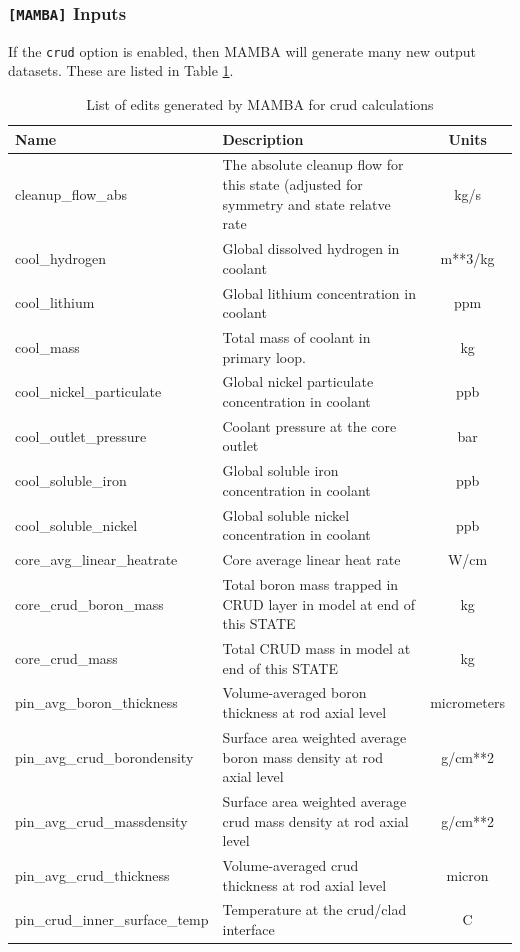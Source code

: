 \FloatBarrier

\subsubsection{\texttt{[MAMBA]} Inputs}

If the \texttt{crud} option is enabled, then MAMBA will generate many new output datasets.  These are listed in Table \ref{tab:mamba-edits}.

\begin{table}[h]
    \centering
    \caption{List of edits generated by MAMBA for \acrshort{crud} calculations}
    \label{tab:mamba-edits}
\begin{tabular}{|l|p{}|c|}\hline
    \textbf{Name} & \textbf{Description} & \textbf{Units} \\\hline
cleanup\_flow\_abs & The absolute cleanup flow for this state (adjusted for symmetry and state relatve rate & kg/s \\ \hline
cool\_hydrogen & Global dissolved hydrogen in coolant & m**3/kg \\\hline
cool\_lithium & Global lithium concentration in coolant & ppm \\\hline
cool\_mass & Total mass of coolant in primary loop. & kg \\\hline
cool\_nickel\_particulate & Global nickel particulate concentration in coolant & ppb \\\hline
cool\_outlet\_pressure & Coolant pressure at the core outlet & bar \\\hline
cool\_soluble\_iron & Global soluble iron concentration in coolant & ppb \\\hline
cool\_soluble\_nickel & Global soluble nickel concentration in coolant & ppb \\\hline
core\_avg\_linear\_heatrate & Core average linear heat rate & W/cm \\\hline
core\_crud\_boron\_mass & Total boron mass trapped in CRUD layer in model at end of this STATE & kg \\\hline
core\_crud\_mass & Total CRUD mass in model at end of this STATE & kg \\\hline
pin\_avg\_boron\_thickness & Volume-averaged boron thickness at rod axial level & micrometers \\\hline
pin\_avg\_crud\_borondensity & Surface area weighted average boron mass density at rod axial level & g/cm**2 \\\hline
pin\_avg\_crud\_massdensity & Surface area weighted average crud mass density at rod axial level & g/cm**2 \\\hline
pin\_avg\_crud\_thickness & Volume-averaged crud thickness at rod axial level & micron \\\hline
pin\_crud\_inner\_surface\_temp & Temperature at the crud/clad interface & C \\\hline
    \end{tabular}
\end{table}

\FloatBarrier